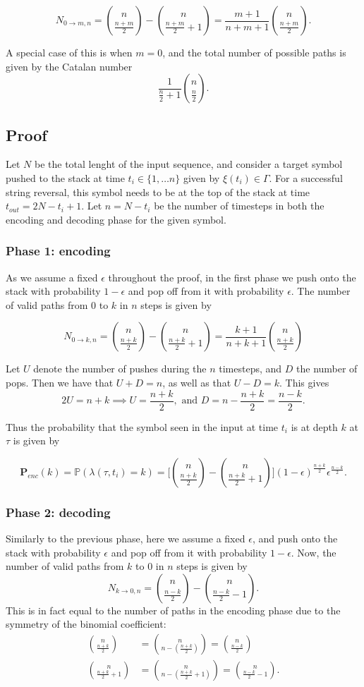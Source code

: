 \documentclass{article}
\newcommand{\eps}{\epsilon}
\begin{document}
$$
N_{0 \rightarrow m,n} = \binom{n}{\frac{n+m}{2}} - \binom{n}{\frac{n+m}{2}+1} = \frac{m+1}{n+m+1}\binom{n}{\frac{n+m}{2}}.
$$

A special case of this is when $m=0$, and the total number of possible paths is given by the Catalan number
$$
\frac{1}{\frac{n}{2}+1}\binom{n}{\frac{n}{2}}.
$$


\subsection{Proof}

Let $N$ be the total lenght of the input sequence, and consider a target symbol pushed to the stack at time $t_i \in \{1, \dots  n\}$ given by $\xi(t_i) \in \Gamma$. For a successful string reversal, this symbol needs to be at the top of the stack at time $t_{out} = 2N - t_i + 1$. Let $n = N - t_i$ be the number of timesteps in both the encoding and decoding phase for the given symbol. 


\subsubsection*{Phase 1: encoding}

As we assume a fixed $\eps$ throughout the proof, in the first phase we push onto the stack with probability $1- \eps$ and pop off from it with probability $\eps$. The number of valid paths from $0$ to $k$ in $n$ steps is given by 

$$
N_{0 \rightarrow k,n } = \binom{n}{\frac{n+k}{2}} - \binom{n}{\frac{n+k}{2}+1} = \frac{k+1}{n+k+1}\binom{n}{\frac{n+k}{2}}
$$

Let $U$ denote the number of pushes during the $n$ timesteps, and $D$ the number of pops. Then we have that $U+D = n$, as well as that $U - D = k$. This gives 
$$
2U = n + k  \implies U = \frac{n + k}{2},\text{ and } D =n - \frac{n + k}{2} = \frac{n-k}{2}.
$$

Thus the probability that the symbol seen in the input at time $t_i$ is at depth $k$ at $\tau$ is given by 

$$
\mathbf{P}_{enc}(k) = \mathbb{P}(\lambda(\tau,t_i) = k) =  \bigg[\binom{n}{\frac{n+k}{2}} - \binom{n}{\frac{n+k}{2}+1}\bigg] (1- \eps)^{\frac{n + k}{2}} \eps^{\frac{n-k}{2}}.
$$

\subsubsection*{Phase 2: decoding}
Similarly to the previous phase, here we assume a fixed $\eps$, and push onto the stack with probability $\eps$ and pop off from it with probability $1-\eps$. Now, the number of valid paths from $k$ to $0$ in $n$ steps is given by 
$$
N_{k \rightarrow 0,n } = \binom{n}{\frac{n-k}{2}} - \binom{n}{\frac{n-k}{2}-1}.
$$ 
This is in fact equal to the number of paths in the encoding phase due to the symmetry of the binomial coefficient:
\begin{align*}
\binom{n}{\frac{n+k}{2}} &= \binom{n}{n-(\frac{n+k}{2})} = \binom{n}{\frac{n-k}{2}} \\
\binom{n}{\frac{n+k}{2}+1} &= \binom{n}{n-(\frac{n+k}{2}+1)} = \binom{n}{\frac{n-k}{2}-1}.
\end{align*}
\end{document}
